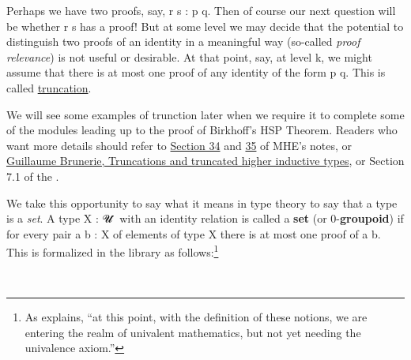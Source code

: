 Perhaps we have two proofs, say, \ab r \ab s : \ab p  \ab q. Then of course our next question will be whether \ab r  \ab s has a proof!  But at some level we may decide that the potential to distinguish two proofs of an identity in a meaningful way (so-called \emph{proof relevance}) is not useful or desirable. At that point, say, at level \ab k, we might assume that there is at most one proof of any identity of the form \ab p   \ab q. This is called \href{https://www.cs.bham.ac.uk/~mhe/HoTT-UF-in-Agda-Lecture-Notes/HoTT-UF-Agda.html#truncation}{truncation}.

We will see some examples of trunction later when we require it to complete some of the \ualib modules leading up to the proof of Birkhoff's HSP Theorem. Readers who want more details should refer to \href{https://www.cs.bham.ac.uk/~mhe/HoTT-UF-in-Agda-Lecture-Notes/HoTT-UF-Agda.html\#truncation}{Section 34} and \href{https://www.cs.bham.ac.uk/~mhe/HoTT-UF-in-Agda-Lecture-Notes/HoTT-UF-Agda.html\#resizing}{35} of MHE's notes, or \href{https://homotopytypetheory.org/2012/09/16/truncations-and-truncated-higher-inductive-types/}{Guillaume Brunerie, Truncations and truncated higher inductive types}, or Section 7.1 of the \hottbook.

We take this opportunity to say what it means in type theory to say that a type is a \emph{set}. A type \ab X \as : \ab 𝓤 \af ̇ with an identity relation  is called a \textbf{set} (or 0-\textbf{groupoid}) if for every pair \ab a \ab b \as : \ab X of elements of type \ab X there is at most one proof of \ab a  \ab b. This is formalized in the \TypeTopology library as follows:\footnote{As \mhe explains, ``at this point, with the definition of these notions, we are entering the realm of univalent mathematics, but not yet needing the univalence axiom.''}
\ccpad
\begin{code}
\>[0]\AgdaSpace{}%
\AgdaSymbol{:}\AgdaSpace{}%
\AgdaSpace{}%
\AgdaSpace{}%
\AgdaSpace{}%
\AgdaSpace{}%
\<%
\\
\>[0]\AgdaSpace{}%
\AgdaSpace{}%
\AgdaSymbol{=}\AgdaSpace{}%
\AgdaSymbol{(}\AgdaSpace{}%
\AgdaSpace{}%
\AgdaSymbol{:}\AgdaSpace{}%
\AgdaSymbol{)}\AgdaSpace{}%
\AgdaSpace{}%
\AgdaSpace{}%
\AgdaSymbol{(}\AgdaSpace{}%
\AgdaSpace{}%
\AgdaSymbol{)}\<%
\end{code}
